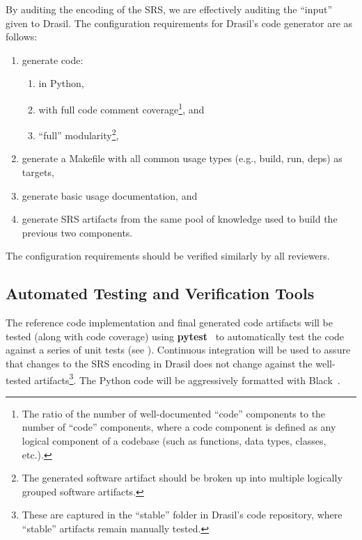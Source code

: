 \documentclass[12pt, titlepage]{article}
\begin{document}
By auditing the encoding of the SRS, we are effectively auditing the ``input''
given to Drasil. The configuration requirements for Drasil's code generator are
as follows:

\begin{enumerate}

    \item generate code:

          \begin{enumerate}

              \item in Python,

              \item with full code comment coverage\footnote{The ratio of the
                        number of well-documented ``code'' components to the
                        number of ``code'' components, where a code component is
                        defined as any logical component of a codebase (such as
                        functions, data types, classes, etc.).}, and

              \item ``full'' modularity\footnote{The generated software artifact
                        should be broken up into multiple logically grouped
                        software artifacts.},

          \end{enumerate}

    \item generate a Makefile with all common usage types (e.g., build, run,
          deps) as targets,

    \item generate basic usage documentation, and

    \item generate SRS artifacts from the same pool of knowledge used to build
          the previous two components.

\end{enumerate}

The configuration requirements should be verified similarly by all reviewers.

\subsection{Automated Testing and Verification Tools}

The reference code implementation and final generated code artifacts will be
tested (along with code coverage) using \textbf{pytest}~\cite{PyTest} to
automatically test the code against a series of unit tests (see
). Continuous integration will be used to assure
that changes to the SRS encoding in Drasil does not change against the
well-tested artifacts\footnote{These are captured in the ``stable'' folder in
    Drasil's code repository, where ``stable'' artifacts remain manually tested.}.
The Python code will be aggressively formatted with Black~\cite{PythonBlack}.
\end{document}
